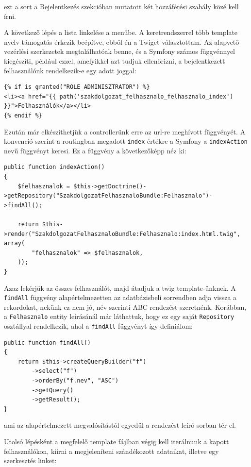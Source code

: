 \documentclass[a4paper,12pt,oneside]{report}
\begin{document}
ezt a sort a Bejelentkezés szekcióban mutatott két hozzáférési szabály közé kell írni.

A következő lépés a lista linkelése a menübe. A keretrendszerrel több template nyelv támogatás érkezik beépítve, ebből én a Twiget\cite{website:twig} választottam. Az alapvető vezérlési szerkezetek megtalálhatóak benne, és a Symfony számos függvénnyel kiegészíti, például ezzel, amelyikkel azt tudjuk ellenőrizni, a bejelentkezett felhasználónk rendelkezik-e egy adott joggal:

\begin{lstlisting}
{% if is_granted("ROLE_ADMINISZTRATOR") %}
<li><a href="{{ path('szakdolgozat_felhasznalo_felhasznalo_index') }}">Felhasználók</a></li>
{% endif %}
\end{lstlisting}

Ezután már elkészíthetjük a controllerünk erre az url-re meghívott függvényét. A konvenció szerint a routingban megadott {\tt index} értékre a Symfony a {\tt indexAction} nevű függvényt keresi. Ez a függvény a következőképp néz ki:

\begin{lstlisting}
public function indexAction()
{
    $felhasznalok = $this->getDoctrine()->getRepository("SzakdolgozatFelhasznaloBundle:Felhasznalo")->findAll();

    return $this->render("SzakdolgozatFelhasznaloBundle:Felhasznalo:index.html.twig", array(
        "felhasznalok" => $felhasznalok,
    ));
}
\end{lstlisting}

Azaz lekérjük az összes felhasználót, majd átadjuk a twig template-ünknek. A {\tt findAll} függvény alapértelmezetten az adatbázisbeli sorrendben adja vissza a rekordokat, nekünk ez nem jó, név szerinti ABC-rendezést szeretnénk. Korábban, a {\tt Felhasznalo} entity leírásánál már láthattuk, hogy ez egy saját {\tt Repository} osztállyal rendelkezik, ahol a {\tt findAll} függvényt így definiálom:

\begin{lstlisting}
public function findAll()
{
    return $this->createQueryBuilder("f")
        ->select("f")
        ->orderBy("f.nev", "ASC")
        ->getQuery()
        ->getResult();
}
\end{lstlisting}

ami az alapértelmezett megvalósítástól egyedül a rendezést leíró sorban tér el.

Utolsó lépésként a megfelelő template fájlban végig kell iterálnunk a kapott felhasználókon, kiírni a megjeleníteni szándékozott adataikat, illetve egy szerkesztés linket:
\end{document}
